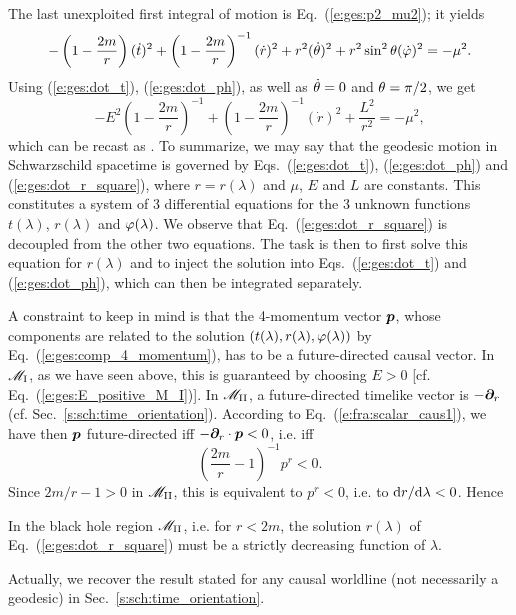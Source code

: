The last unexploited first integral of motion is Eq.~(\ref{e:ges:p2_mu2}); it
yields
\[
   - \left( 1 - \frac{2m}{r} \right) (\dot{t})^2 +
   \left( 1 - \frac{2m}{r} \right) ^{-1}  (\dot{r})^2
   + r^2 (\dot{\theta})^2 + r^2 \sin^2\theta (\dot{\varphi})^2  = - \mu^2 .
\]
Using (\ref{e:ges:dot_t}), (\ref{e:ges:dot_ph}), as well as
$\dot{\theta}=0$ and $\theta=\pi/2$, we get
\[
    -  E^2 \left(1 - \frac{2m}{r} \right) ^{-1}
    +  \left( 1 - \frac{2m}{r} \right) ^{-1}  (\dot{r})^2
    +  \frac{L^2}{r^2} = - \mu^2 ,
\]
which can be recast as
\be \label{e:ges:dot_r_square}
     .
\ee
To summarize, we may say that the geodesic motion in Schwarzschild spacetime is governed by
Eqs.~(\ref{e:ges:dot_t}), (\ref{e:ges:dot_ph}) and (\ref{e:ges:dot_r_square}),
where $r=r(\lambda)$ and $\mu$, $E$ and $L$ are constants.
This constitutes a system of 3 differential equations for the 3 unknown
functions $t(\lambda)$, $r(\lambda)$ and $\varphi(\lambda)$.
We observe
that Eq.~(\ref{e:ges:dot_r_square}) is decoupled from the other two equations.
The task is then to first solve this equation for $r(\lambda)$ and to inject
the solution into Eqs.~(\ref{e:ges:dot_t}) and (\ref{e:ges:dot_ph}), which
can then be integrated separately.

A constraint to keep in mind is that the 4-momentum vector $\bm{p}$, whose
components are related to the solution $(t(\lambda), r(\lambda), \varphi(\lambda))$
by Eq.~(\ref{e:ges:comp_4_momentum}), has to be a future-directed causal vector.
In $\mathscr{M}_{\rm I}$, as we have seen above, this is guaranteed by choosing $E > 0$
[cf. Eq.~(\ref{e:ges:E_positive_M_I})]. In $\mathscr{M}_{\rm II}$, a future-directed
timelike vector is $-\bm{\partial}_r$ (cf. Sec.~\ref{s:sch:time_orientation}).
According to Eq.~(\ref{e:fra:scalar_caus1}), we have then
$\bm{p}$ future-directed iff $-\bm{\partial}_r\cdot\bm{p} < 0$, i.e. iff
\[
    \left(\frac{2m}{r} - 1  \right) ^{-1} p^r < 0  .
\]
Since $2m/r - 1 > 0$ in $\mathscr{M}_{\rm II}$, this is equivalent to $p^r < 0$, i.e.
to $\mathrm{d} r/\mathrm{d}\lambda < 0$. Hence
\begin{greybox}
In the black hole region $\mathscr{M}_{\rm II}$, i.e. for $r<2m$,
the solution $r(\lambda)$ of Eq.~(\ref{e:ges:dot_r_square})
must be a strictly decreasing function of $\lambda$.
\end{greybox}
Actually, we recover the result stated for any causal worldline (not necessarily
a geodesic) in Sec.~\ref{s:sch:time_orientation}.

